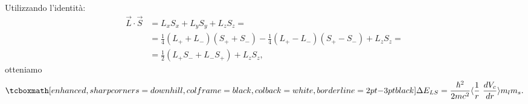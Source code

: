 \documentclass[a4paper,12pt,oneside]{book}
\begin{document}
Utilizzando l'identità:
	\begin{align}
		\vec{L} \cdot \vec{S} & =   L_xS_x+L_yS_y+L_zS_z= \nonumber  \\
		& =  \frac{1}{4} \left( L_{+}+L_{-} \right)  \left( S_{+}+S_{-}\right)-\frac{1}{4} \left( L_{+}-L_{-} \right) \left( S_{+}-S_{-} \right)+L_zS_z =  \nonumber \\
			& =  \frac{1}{2} \left( L_{+}S_{-}+L_{-}S_{+} \right)+ L_zS_z ,
	\end{align}
otteniamo
	\begin{equation}
		\tcboxmath[enhanced, sharp corners=downhill, colframe=black, colback=white, borderline={2pt}{-3pt}{black}]{
		\Delta E_{LS}= \frac{\hbar^2}{2mc^2} \langle \frac{1}{r} \ \frac{dV_c}{dr}   \rangle m_lm_s .
		}
	\end{equation}
\end{document}
